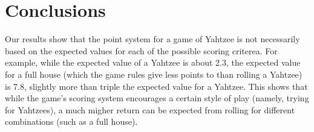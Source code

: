 \section{Conclusions}

Our results show that the point system for a game of Yahtzee is not necessarily
based on the expected values for each of the possible scoring criterea.
For example, while the expected value of a Yahtzee is about 2.3, the expected
value for a full house (which the game rules give less points to than rolling
a Yahtzee) is 7.8, slightly more than triple the expected value for a Yahtzee.
This shows that while the game's scoring system encourages a certain style of
play (namely, trying for Yahtzees), a much migher return can be expected from
rolling for different combinations (such as a full house).
